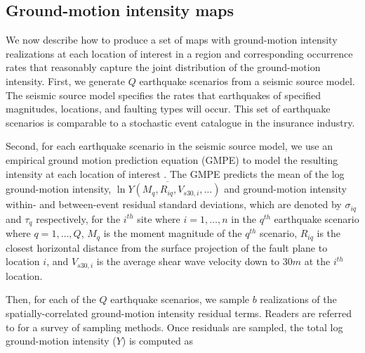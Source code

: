 
\subsection{Ground-motion intensity maps}
We now describe how to produce a set of maps with ground-motion intensity realizations at each location of interest in a region and corresponding occurrence rates that reasonably capture the joint distribution of the ground-motion intensity. First, we generate $Q$ earthquake scenarios from a seismic source model. The seismic source model specifies the rates that earthquakes of specified magnitudes, locations, and faulting types will occur. This set of earthquake scenarios is comparable to a stochastic event catalogue in the insurance industry.

Second, for each earthquake scenario in the seismic source model, we use an empirical ground motion prediction equation (GMPE) to model the resulting intensity at each location of interest \cite[e.g.,][]{boore_ground-motion_2008,abrahamson_summary_2008,chiou_nga_2008,campbell_nga_2008}. The GMPE predicts the mean of the log ground-motion intensity, $\overline{\ln Y (M_q, R_{iq}, V_{s30,i}, \ldots) }$ and ground-motion intensity within- and between-event residual standard deviations, which are denoted by $\sigma_{iq}$ and $\tau_q$ respectively, for the $i^{th}$ site where $i = 1, \ldots, n$ in the $q^{th}$ earthquake scenario where $q=1, \ldots, Q$, $M_q$ is the moment magnitude of the $q^{th}$ scenario, $R_{iq}$ is the closest horizontal distance from the surface projection of the fault plane to location $i$, and $V_{s30,i}$ is the average shear wave velocity down to 30$m$ at the $i^{th}$ location. 

Then, for each of the $Q$ earthquake scenarios, we sample $b$ realizations of the spatially-correlated ground-motion intensity residual terms. Readers are referred to \cite{han_probabilistic_2012} for a survey of sampling methods.  Once residuals are sampled, the total log ground-motion intensity ($Y$) is computed as 

